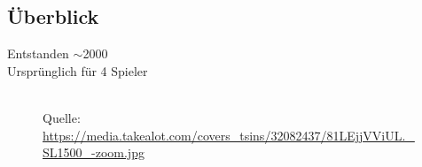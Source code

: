 \documentclass[12pt, draft]{beamer}
\begin{document}
\subsection{Überblick}
\begin{frame}
	Entstanden $\sim$2000\\
	Ursprünglich für 4 Spieler
    \begin{figure}[tp]
        \centering
        \\
        \tiny Quelle: \url{https://media.takealot.com/covers\_tsins/32082437/81LEjjVViUL.\_SL1500\_-zoom.jpg}
    \end{figure}
\end{frame}
\end{document}
